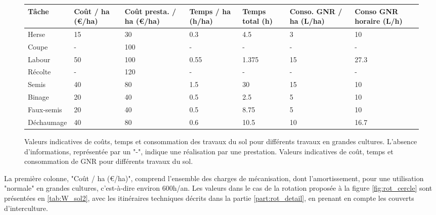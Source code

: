\documentclass{book}
\begin{document}
\begin{figure}[h!]
\center
\footnotesize
\begin{tabular}{ | p{} | p{}| p{2cm}| p{} | p{} | p{2cm} | p{}| }
\hline
	Tâche & Coût / ha (\euro{}/ha) & Coût presta. / ha (\euro{}/ha) & Temps / ha (h/ha) & Temps total (h) & Conso. GNR / ha (L/ha) & Conso GNR horaire (L/h) \\ \hline
	Herse & 15 & 30 & 0.3 & 4.5 & 3 & 10 \\ \hline
	Coupe & - & 100 & - & - & - & - \\ \hline
	Labour & 50 & 100 & 0.55 & 1.375 & 15 & 27.3 \\ \hline
	Récolte & - & 120 & - & - & - & - \\ \hline
	Semis & 40 & 80 & 1.5 & 30 & 15 & 10 \\ \hline
	Binage & 20 & 40 & 0.5 & 2.5 & 5 & 10 \\ \hline
	Faux-semis & 20 & 40 & 0.5 & 8.75 & 5 & 10 \\ \hline
	Déchaumage & 40 & 80 & 0.6 & 10.5 & 10 & 16.7 \\ \hline
\end{tabular}
\caption{Valeurs indicatives de coûts, temps et consommation des travaux du sol pour différents travaux en grandes cultures. L'absence d'informations, représentée par un "-", indique une réalisation par une prestation. Valeurs indicatives de coût, temps et consommation de GNR pour différents travaux du sol.}
\label{tab:W_sol1}
\end{figure}

La première colonne, "Coût / ha (\euro{}/ha)", comprend l'ensemble des charges de mécanisation, dont l'amortissement, pour une utilisation "normale" en grandes cultures, c'est-à-dire environ 600h/an. Les valeurs dans le cas de la rotation proposée à la figure \ref{fig:rot_cercle} sont présentées en \ref{tab:W_sol2}, avec les itinéraires techniques décrits dans la partie \ref{part:rot_detail}, en prenant en compte les couverts d'interculture.
\end{document}
